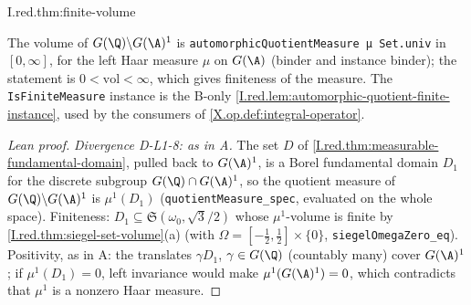 \begin{tfformal}{I.red.thm:finite-volume}
\begin{tffidelity}
The volume of $G(\Q)\backslash G(\A)^1$ is \texttt{automorphicQuotientMeasure μ Set.univ} in $[0,\infty]$, for the left Haar measure $\mu$ on $G(\A)$ (binder and instance binder); the statement is $0<\text{vol}<\infty$, which gives finiteness of the measure. The \texttt{IsFiniteMeasure} instance is the B-only \cref{I.red.lem:automorphic-quotient-finite-instance}, used by the consumers of \cref{X.op.def:integral-operator}.
\end{tffidelity}
\end{tfformal}
\begin{proof}[Lean proof]
\emph{Divergence D-L1-8: as in A.} The set $D$ of \cref{I.red.thm:measurable-fundamental-domain}, pulled back to $G(\A)^1$, is a Borel fundamental domain $D_1$ for the discrete subgroup $G(\Q)\cap G(\A)^1$, so the quotient measure of $G(\Q)\backslash G(\A)^1$ is $\mu^1(D_1)$ (\texttt{quotientMeasure\_spec}, evaluated on the whole space). Finiteness: $D_1\subseteq\mathfrak S(\omega_0,\sqrt3/2)$ whose $\mu^1$-volume is finite by \cref{I.red.thm:siegel-set-volume}(a) (with $\Omega=[-\tfrac12,\tfrac12]\times\{0\}$, \texttt{siegelOmegaZero\_eq}). Positivity, as in A: the translates $\gamma D_1$, $\gamma\in G(\Q)$ (countably many) cover $G(\A)^1$; if $\mu^1(D_1)=0$, left invariance would make $\mu^1(G(\A)^1)=0$, which contradicts that $\mu^1$ is a nonzero Haar measure.
\end{proof}

